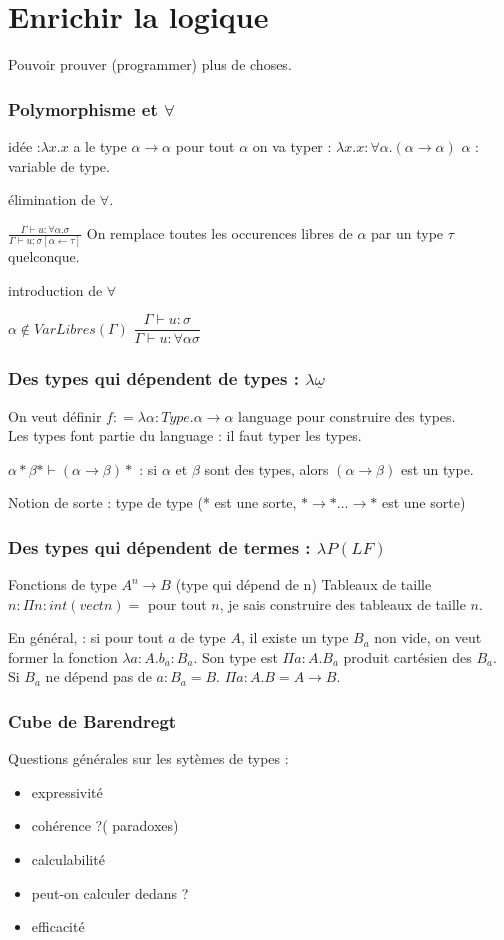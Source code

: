 \documentclass[10pt,a4paper]{article}
\begin{document}
\section{Enrichir la logique}

Pouvoir prouver (programmer) plus de choses.

\subsubsection{Polymorphisme et $\forall$}

idée :$ \lambda x . x$ a le type $\alpha → \alpha$ pour tout $\alpha$
on va typer  : $\lambda x .x : \forall \alpha.( \alpha → \alpha) $
$\alpha$ : variable de type.

élimination de $\forall$.

$\frac{\Gamma \vdash u :\forall \alpha . \sigma}{\Gamma \vdash u :\sigma[ \alpha ← \tau]}$
On remplace toutes les occurences libres de $\alpha$ par un type $\tau$ quelconque.

introduction de $\forall$

$\alpha \not \in VarLibres(\Gamma)$
$\dfrac{\Gamma \vdash u : \sigma}{\Gamma \vdash u : \forall \alpha \sigma}$


\subsubsection{Des types qui dépendent de types : $\lambda \underline{\omega}$}
On veut définir $f : = \lambda \alpha : Type . \alpha → \alpha$ language pour construire des types.\\
Les types font partie du language : il faut typer les types.

$\alpha * \beta * \vdash (\alpha → \beta) *$ : si $\alpha$ et $\beta$ sont des types, alors $(\alpha → \beta)$ est un type.

Notion de sorte : type de type (* est une sorte, $* → * \dots → *$ est une sorte)\\

\subsubsection{Des types qui dépendent de termes : $\lambda P (LF)$}
Fonctions de type $A^n → B$ (type qui dépend de n)
Tableaux de taille $n : \Pi n : int(vect n) =$ pour tout $n$, je sais construire des tableaux de taille $n$.

En général, : si pour tout $a$ de type $A$, il existe un type $B_a$ non vide, on veut former la fonction $\lambda a : A . b_a : B_a$. Son type est $\Pi a : A.B_a$ produit cartésien des $B_a$.
Si $B_a$ ne dépend pas de $a : B_a = B$.   $\Pi a : A. B = A → B$.

\subsubsection{Cube de Barendregt}

Questions générales sur les sytèmes de types : 
\begin{itemize}
 \item expressivité
 \item cohérence ?( paradoxes)
 \item calculabilité
 \item peut-on calculer dedans ?
 \item efficacité
\end{itemize}
\end{document}

